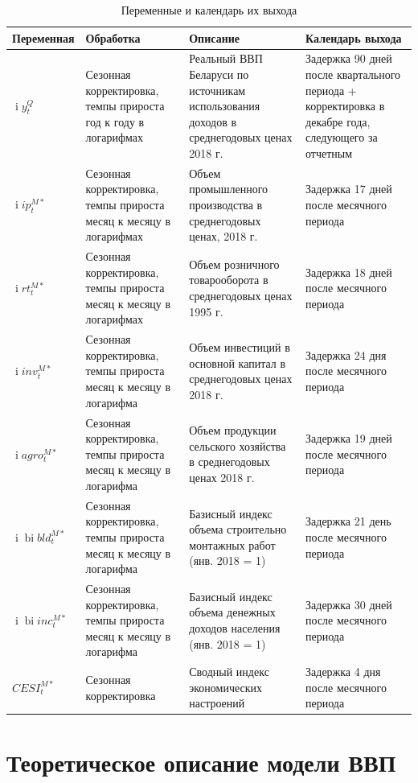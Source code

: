\documentclass[a4paper, 14pt]{extreport}
\numberwithin{equation}{section}
\renewcommand{\i}{\operatorname{i}}
\newcommand{\bi}{\operatorname{bi}}
\numberwithin{equation}{section}
\begin{document}
	\begin{longtable}{|m{3cm}|m{4cm}|m{3cm}|m{5cm}|}
		\caption{Переменные и календарь их выхода}
		\label{tab:variables} \\ 
		\hline
		\textbf{Переменная} & \textbf{Обработка} & \textbf{Описание} & \textbf{Календарь выхода} \\ 
		\hline
		$\i y_t^{Q}$ & Сезонная корректировка, темпы прироста год к году в логарифмах & Реальный ВВП Беларуси по источникам использования доходов в среднегодовых ценах 2018 г. &
		Задержка 90 дней после квартального периода + корректировка в декабре года, следующего за отчетным \\ 
		\hline
		$\i ip_t^{M*}$ & Сезонная корректировка, темпы прироста месяц к месяцу в логарифмах & Объем промышленного производства в среднегодовых ценах, 2018 г. &
		Задержка 17 дней после месячного периода \\ 
		\hline
		$\i rt_t^{M*}$ & Сезонная корректировка, темпы прироста месяц к месяцу в логарифмах & Объем розничного товарооборота в среднегодовых ценах 1995 г. &
		Задержка 18 дней после месячного периода \\ 
		\hline
		$\i inv_t^{M*}$ & Сезонная корректировка, темпы прироста месяц к месяцу в логарифма & Объем инвестиций в основной капитал в среднегодовых ценах 2018 г. &
		Задержка 24 дня после месячного периода \\ 
		\hline
		$\i agro_t^{M*}$ & Сезонная корректировка, темпы прироста месяц к месяцу в логарифма & Объем продукции сельского хозяйства в среднегодовых ценах 2018 г. &
		Задержка 19 дней после месячного периода \\ 
		\hline
		$\i \bi bld_t^{M*}$ & Сезонная корректировка, темпы прироста месяц к месяцу в логарифма & Базисный индекс объема строительно монтажных работ (янв. 2018 = 1) &
		Задержка 21 день после месячного периода \\ 
		\hline
		$\i \bi inc_t^{M*}$ & Сезонная корректировка, темпы прироста месяц к месяцу в логарифма & Базисный индекс объема денежных доходов населения (янв. 2018 = 1) &
		Задержка 30 дней после месячного периода \\
		\hline
		$CESI_t^{M*}$ & Сезонная корректировка & Сводный индекс экономических настроений &
		Задержка 4 дня после месячного периода \\
		\hline
	\end{longtable}
	
	\section{Теоретическое описание модели ВВП}
	
\end{document}
